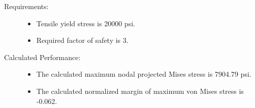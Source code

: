 \begin{description}
\item[Requirements:]\hfill
\begin{itemize}
\item
Tensile yield stress is 20000 psi.
\item
Required factor of safety is 3.
\end{itemize}

\item[Calculated Performance:]\hfill
\begin{itemize}
\item The calculated maximum nodal projected Mises stress is 7904.79 psi.
\item The calculated normalized margin of maximum von Mises stress is -0.062.
\end{itemize}
\end{description}
